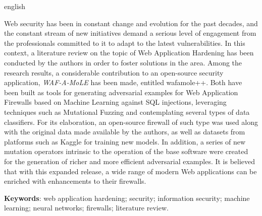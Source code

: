 \begin{resumo}[Abstract]
\begin{otherlanguage*}{english}
\begin{SingleSpace}
Web security has been in constant change and evolution for the past decades, and the constant stream of new initiatives demand a serious level of engagement from the professionals committed to it to adapt to the latest vulnerabilities. In this context, a literature review on the topic of Web Application Hardening has been conducted by the authors in order to foster solutions in the area. Among the research results, a considerable contribution to an open-source security application, \textit{WAF-A-MoLE} has been made, entitled wafamole++. Both have been built as tools for generating adversarial examples for Web Application Firewalls based on Machine Learning against SQL injections, leveraging techniques such as Mutational Fuzzing and contemplating several types of data classifiers. For its elaboration, an open-source firewall of such type was used along with the original data made available by the authors, as well as datasets from platforms such as Kaggle for training new models. In addition, a series of new mutation operators intrinsic to the operation of the base software were created for the generation of richer and more efficient adversarial examples. It is believed that with this expanded release, a wide range of modern Web applications can be enriched with enhancements to their firewalls.
\end{SingleSpace}


\vspace{\onelineskip}
   \textbf{Keywords}: web application hardening; security; information security; machine learning; neural networks; firewalls; literature review.
   
 \end{otherlanguage*}
\end{resumo}




  
